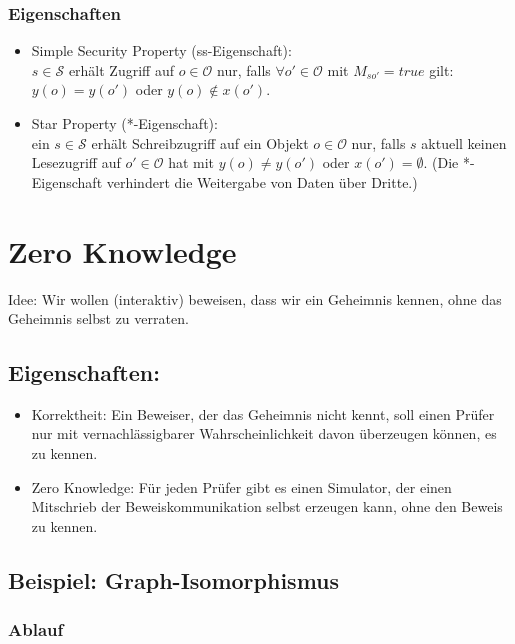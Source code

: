 \documentclass[a4paper,twoside,DIV15,BCOR12mm]{scrbook}
\begin{document}
\subsection{Eigenschaften}

\begin{itemize}
	\item Simple Security Property (ss-Eigenschaft):\\ $s \in \mathcal{S}$ erhält Zugriff auf $o \in \mathcal{O}$ nur, falls $\forall o' \in \mathcal{O}$ mit $M_{so'} = true$ gilt: $y(o) = y(o')$ oder $y(o) \notin x(o')$.
	\item Star Property (*-Eigenschaft):\\ ein $s \in \mathcal{S}$ erhält Schreibzugriff auf ein Objekt $o \in \mathcal{O}$ nur, falls $s$ aktuell keinen Lesezugriff auf $o' \in \mathcal{O}$ hat mit $y(o) \neq y(o')$ oder $x(o') = \emptyset$. (Die *-Eigenschaft verhindert die Weitergabe von Daten über Dritte.)
\end{itemize}


\chapter{Zero Knowledge}

Idee: Wir wollen (interaktiv) beweisen, dass wir ein Geheimnis kennen, ohne das Geheimnis selbst zu verraten. 

\section{Eigenschaften:} 

\begin{itemize}
	\item Korrektheit: Ein Beweiser, der das Geheimnis nicht kennt, soll einen Prüfer nur mit vernachlässigbarer Wahrscheinlichkeit davon überzeugen können, es zu kennen.
	\item Zero Knowledge: Für jeden Prüfer gibt es einen Simulator, der einen Mitschrieb der Beweiskommunikation selbst erzeugen kann, ohne den Beweis zu kennen.
\end{itemize}

\section{Beispiel: Graph-Isomorphismus}

\subsection{Ablauf}
\end{document}
